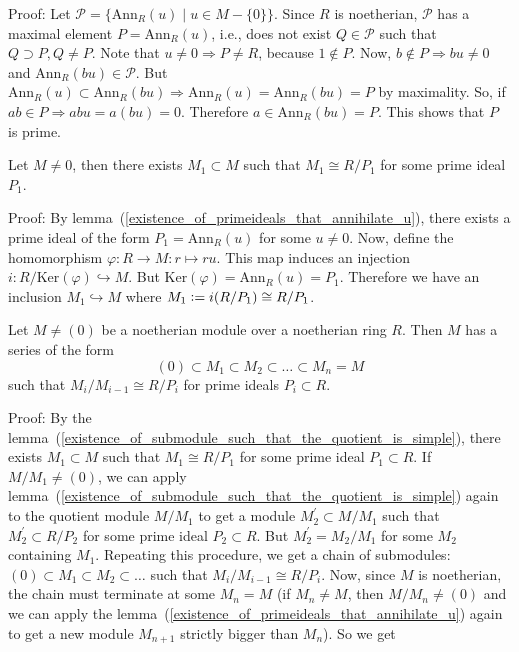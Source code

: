 Proof: Let $\mathcal{P}=\{\text{Ann}_R(u)\;|\;u\in M-\{0\}\}$. Since $R$ is noetherian, 
$\mathcal{P}$ has a maximal element $P=\text{Ann}_R(u)$, i.e., does not exist $Q\in\mathcal{P}$ 
such that $Q\supset P,Q\neq P$. Note that $u\neq0\Rightarrow P\neq R$, because $1\notin P$. 
Now, $b\notin P\Rightarrow bu\neq0$ and $\text{Ann}_R(bu)\in\mathcal{P}$. 
But $\text{Ann}_R(u)\subset \text{Ann}_R(bu)\Rightarrow \text{Ann}_R(u)=\text{Ann}_R(bu)=P$ 
by maximality. So, if $ab\in P\Rightarrow abu=a(bu)=0$. Therefore $a\in \text{Ann}_R(bu)=P$. 
This shows that $P$ is prime. 
\begin{dang}
    \begin{lemma}\label{existence_of_submodule_such_that_the_quotient_is_simple}
    Let $M\neq0$, then there exists $M_1\subset M$ such that $M_1\cong R/P_1$ for some prime ideal $P_1$.
    \end{lemma}
\end{dang}
Proof: By lemma~(\ref{existence_of_primeideals_that_annihilate_u}), there exists a prime ideal of the form $P_1=\text{Ann}_R(u)$ for some $u\neq0$. Now, define the homomorphism $\varphi:R\rightarrow M: r\mapsto ru$. This map induces an injection $i:R/\text{Ker}(\varphi)\hookrightarrow M$. But $\text{Ker}(\varphi)=\text{Ann}_R(u)=P_1$. Therefore we have an inclusion $M_1\hookrightarrow M$ where $M_1\bydef i(R/P_1)\cong R/P_1$.
\begin{dang}
\begin{theorem}
    Let $M\neq(0)$ be a noetherian module over a noetherian ring $R$. Then $M$ has a series of the form
    \begin{equation}
         (0)\subset M_1\subset M_2\subset \dots\subset M_n= M
    \end{equation}
    such that $M_i/M_{i-1}\cong R/P_i$ for prime ideals $P_i\subset R$.
\end{theorem}
\end{dang}
Proof: By the lemma~(\ref{existence_of_submodule_such_that_the_quotient_is_simple}), there exists $M_1\subset M$ such that $M_1\cong R/P_1$ for some prime ideal $P_1\subset R$. If $M/M_1\neq (0)$, we can apply lemma~(\ref{existence_of_submodule_such_that_the_quotient_is_simple}) again to the quotient module $M/M_1$ to get a module $M_2^\prime\subset M/M_1$ such that $M_2^\prime\subset R/P_2$ for some prime ideal $P_2\subset R$. But $M_2^\prime=M_2/M_1$ for some $M_2$ containing $M_1$. Repeating this procedure, we get a chain of submodules: $(0)\subset M_1\subset M_2\subset \dots$ such that $M_i/M_{i-1}\cong R/P_i$. Now, since $M$ is noetherian, the chain must terminate at some $M_n= M$ (if $M_n\neq M$, then $M/M_n\neq(0)$ and we can apply the lemma~(\ref{existence_of_primeideals_that_annihilate_u}) again to get a new module $M_{n+1}$ strictly bigger than $M_n$). So we get
